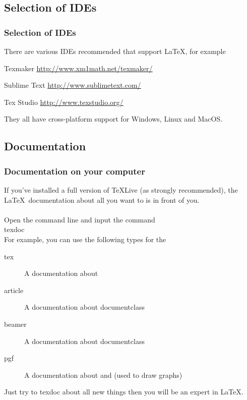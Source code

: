 \documentclass{beamer}
\begin{document}
\subsection{Selection of IDEs}

\begin{frame}
	\frametitle{Selection of IDEs}
	There are various IDEs recommended that support \LaTeX , for example\\
	\begin{block}{Texmaker}
		\href{http://www.xm1math.net/texmaker/}{\color{blue}\underline{http://www.xm1math.net/texmaker/}}
	\end{block}
	\begin{block}{Sublime Text}
		\href{http://www.sublimetext.com/}{\color{blue}\underline{http://www.sublimetext.com/}}
	\end{block}
	\begin{block}{Tex Studio}
		\href{http://www.texstudio.org/}{\color{blue}\underline{http://www.texstudio.org/}}
	\end{block}
	They all have cross-platform support for Windows, Linux and MacOS.
\end{frame}

\subsection{Documentation}

\begin{frame}
	\frametitle{Documentation on your computer}
	If you've installed a full version of TeXLive (as strongly recommended), the \LaTeX\ documentation about all you want to is in front of you.\\
	\ \\
	Open the command line and input the command\\
	\alert{texdoc} \\
	For example, you can use the following types for the \\
	\begin{description}
		\item[tex] 		A documentation about \\
		\item[article] 	A documentation about documentclass \\
		\item[beamer] 	A documentation about documentclass \\
		\item[pgf]		A documentation about  and  (used to draw graphs)\\
	\end{description}
	Just try to \alert{texdoc} about all new things then you will be an expert in \LaTeX.
\end{frame}
\end{document}
